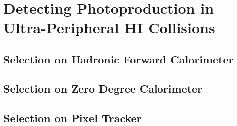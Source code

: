 
\chapter{Detecting Photoproduction in Ultra-Peripheral HI Collisions}

\section{Selection on Hadronic Forward Calorimeter}

\section{Selection on Zero Degree Calorimeter}

\section{Selection on Pixel Tracker}
